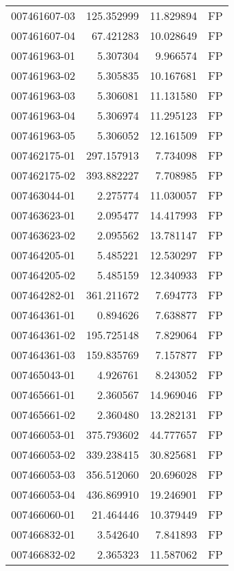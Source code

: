 \begin{tabular}{lrrl}
007461607-03 &  125.352999 &      11.829894 &   FP \\
007461607-04 &   67.421283 &      10.028649 &   FP \\
007461963-01 &    5.307304 &       9.966574 &   FP \\
007461963-02 &    5.305835 &      10.167681 &   FP \\
007461963-03 &    5.306081 &      11.131580 &   FP \\
007461963-04 &    5.306974 &      11.295123 &   FP \\
007461963-05 &    5.306052 &      12.161509 &   FP \\
007462175-01 &  297.157913 &       7.734098 &   FP \\
007462175-02 &  393.882227 &       7.708985 &   FP \\
007463044-01 &    2.275774 &      11.030057 &   FP \\
007463623-01 &    2.095477 &      14.417993 &   FP \\
007463623-02 &    2.095562 &      13.781147 &   FP \\
007464205-01 &    5.485221 &      12.530297 &   FP \\
007464205-02 &    5.485159 &      12.340933 &   FP \\
007464282-01 &  361.211672 &       7.694773 &   FP \\
007464361-01 &    0.894626 &       7.638877 &   FP \\
007464361-02 &  195.725148 &       7.829064 &   FP \\
007464361-03 &  159.835769 &       7.157877 &   FP \\
007465043-01 &    4.926761 &       8.243052 &   FP \\
007465661-01 &    2.360567 &      14.969046 &   FP \\
007465661-02 &    2.360480 &      13.282131 &   FP \\
007466053-01 &  375.793602 &      44.777657 &   FP \\
007466053-02 &  339.238415 &      30.825681 &   FP \\
007466053-03 &  356.512060 &      20.696028 &   FP \\
007466053-04 &  436.869910 &      19.246901 &   FP \\
007466060-01 &   21.464446 &      10.379449 &   FP \\
007466832-01 &    3.542640 &       7.841893 &   FP \\
007466832-02 &    2.365323 &      11.587062 &   FP \\

\end{tabular}
